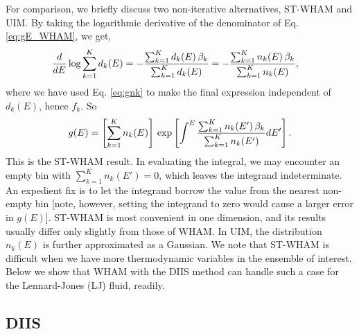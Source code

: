 \documentclass{gMOS2e}
\begin{document}
For comparison,
we briefly discuss
two non-iterative alternatives, ST-WHAM\cite{
fenwick2008, kim2011}
and UIM\cite{
kastner2005, kastner2009}.
%
By taking the logarithmic derivative of
the denominator of Eq. \eqref{eq:gE_WHAM},
we get,
%
\begin{align}
\frac{d}{dE}
\log
  \sum_{k = 1}^K d_k(E)
&=
-
\frac{
  \sum_{k = 1}^K d_k(E) \, \beta_k
}
{
  \sum_{k = 1}^K d_k(E)
}
=
-
\frac{
  \sum_{k = 1}^K n_k(E) \, \beta_k
}
{
  \sum_{k = 1}^K n_k(E)
},
\notag
\end{align}
%
where
we have used Eq. \eqref{eq:gnk}
to make the final expression
independent of $d_k(E)$, hence $f_k$.
%
So
\begin{align}
g(E)
=
\left[
  \sum_{k = 1}^K n_k(E)
\right]
\,
\exp
\left[
\int^E
    \frac{ \sum_{k = 1}^K n_k(E') \, \beta_k }
         { \sum_{k = 1}^K n_k(E') }
  dE'
\right].
\notag
\end{align}
%
This is the ST-WHAM result.
%
In evaluating the integral,
we may encounter an empty bin
with $\sum_{k = 1}^K n_k(E') = 0$,
which leaves the integrand indeterminate.
%
An expedient fix is to let the integrand borrow
the value from the nearest non-empty bin
%
[note, however, setting the integrand to zero
would cause a larger error in $g(E)$].
%
ST-WHAM is most convenient in one dimension,
and its results usually differ only slightly
from those of WHAM\cite{kim2011}.
%
In UIM\cite{
kastner2005, kastner2009},
the distribution $n_k(E)$
is further approximated as a Gaussian.
%
We note that ST-WHAM is difficult when we have more
thermodynamic variables in the ensemble of interest.
%
Below we show that WHAM with the DIIS method can
handle such a case
for the Lennard-Jones (LJ) fluid, readily.




\subsection{\label{sec:DIIS}DIIS}
\end{document}
